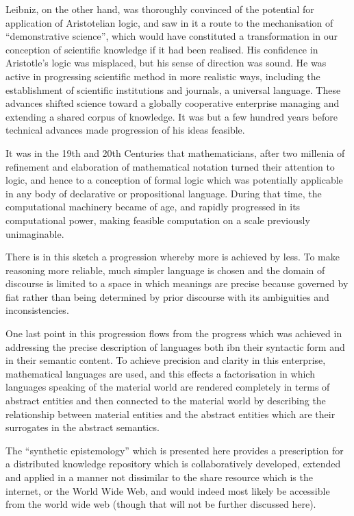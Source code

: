 \documentclass[10pt,titlepage]{book}
\begin{document}
Leibniz, on the other hand, was thoroughly convinced of the potential for application of Aristotelian logic, and saw in it a route to the mechanisation of ``demonstrative science'', which would have constituted a transformation in our conception of scientific knowledge if it had been realised.
His confidence in Aristotle's logic was misplaced, but his sense of direction was sound.
He was active in progressing scientific method in more realistic ways, including the establishment of scientific institutions and journals, a universal language.
These advances shifted science toward a globally cooperative enterprise managing and extending a shared corpus of knowledge.
It was but a few hundred years before technical advances made progression of his ideas feasible.

It was in the 19th and 20th Centuries that mathematicians, after two millenia of refinement and elaboration of mathematical notation turned their attention to logic, and hence to a conception of formal logic which was potentially applicable in any body of declarative or propositional language.
During that time, the computational machinery became of age, and rapidly progressed in its computational power, making feasible computation on a scale previously unimaginable.

There is in this sketch a progression whereby more is achieved by less.
To make reasoning more reliable, much simpler language is chosen and the domain of discourse is limited to a space in which meanings are precise because governed by fiat rather than being determined by prior discourse with its ambiguities and inconsistencies.

One last point in this progression flows from the progress which was achieved in addressing the precise description of languages both ibn their syntactic form and in their semantic content.
To achieve precision and clarity in this enterprise, mathematical languages are used, and this effects a factorisation in which languages speaking of the material world are rendered completely in terms of abstract entities and then connected to the material world by describing the relationship between material entities and the abstract entities which are their surrogates in the abstract semantics. 

The ``synthetic epistemology'' which is presented here provides a prescription for a distributed knowledge repository which is collaboratively developed, extended and applied in a manner not dissimilar to the share resource which is the internet, or the World Wide Web, and would indeed most likely be accessible from the world wide web (though that will not be further discussed here).
\end{document}

